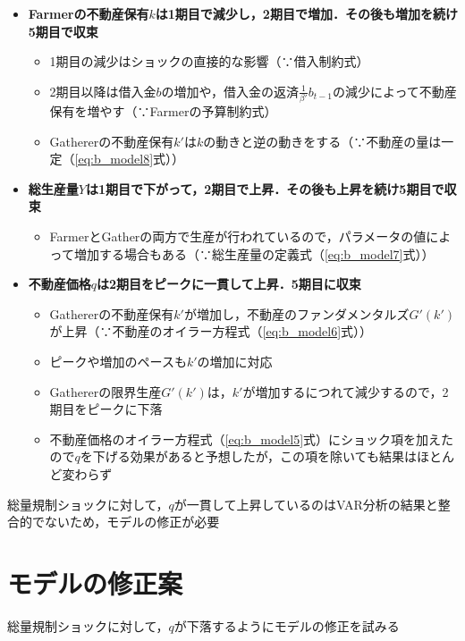 \documentclass[dvipdfmx]{jlreq}
\begin{document}
\begin{itemize}
  \item \textbf{Farmerの不動産保有$k$は1期目で減少し，2期目で増加．その後も増加を続け5期目で収束}
  \begin{itemize}
    \item 1期目の減少はショックの直接的な影響（∵借入制約式）
    \item 2期目以降は借入金$b$の増加や，借入金の返済$\frac{1}{\beta'} b_{t-1}$の減少によって不動産保有を増やす（∵Farmerの予算制約式）
    \item Gathererの不動産保有$k'$は$k$の動きと逆の動きをする（∵不動産の量は一定（\eqref{eq:b_model8}式））
  \end{itemize}
\end{itemize}


\begin{itemize}
  \item \textbf{総生産量$Y$は1期目で下がって，2期目で上昇．その後も上昇を続け5期目で収束}
  \begin{itemize}
    \item FarmerとGatherの両方で生産が行われているので，パラメータの値によって増加する場合もある（∵総生産量の定義式（\eqref{eq:b_model7}式））
  \end{itemize}
\end{itemize}

\begin{itemize}
  \item \textbf{不動産価格$q$は2期目をピークに一貫して上昇．5期目に収束}
  \begin{itemize}
    \item Gathererの不動産保有$k'$が増加し，不動産のファンダメンタルズ$G'(k')$が上昇（∵不動産のオイラー方程式（\eqref{eq:b_model6}式））
    \item ピークや増加のペースも$k'$の増加に対応
    \item Gathererの限界生産$G'(k')$は，$k'$が増加するにつれて減少するので，2期目をピークに下落
    \item 不動産価格のオイラー方程式（\eqref{eq:b_model5}式）にショック項を加えたので$q$を下げる効果があると予想したが，この項を除いても結果はほとんど変わらず
  \end{itemize}
\end{itemize}

総量規制ショックに対して，$q$が一貫して上昇しているのはVAR分析の結果と整合的でないため，モデルの修正が必要

\newpage

\section{モデルの修正案}
総量規制ショックに対して，$q$が下落するようにモデルの修正を試みる
\end{document}
